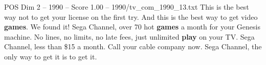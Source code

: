 \begin{textsample}{POS Dim 2 – 1990 – Score 1.00 – 1990/tv\_com\_1990\_13.txt}  \label{ex:f2_pos_038}
This is the best way not to get your license on the first try.
And this is the best way to get video \textbf{games}.
We found it!
Sega Channel, over 70 hot \textbf{games} a month for your Genesis machine.
No lines, no limits, no late fees, just unlimited \textbf{play} on your TV.
Sega Channel, less than \$15 a month.
Call your cable company now.
Sega Channel, the only way to get it is to get it.

\end{textsample}
